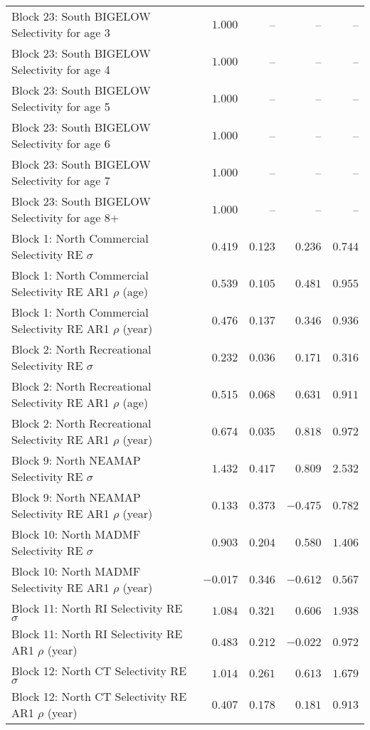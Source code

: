 \documentclass[
]{article}
\begin{document}
\begin{landscape}
\begin{longtable}[t]{lrrrr}
Block 23: South BIGELOW Selectivity for age 3 & $1.000$ & -- & -- & --\\
\addlinespace
Block 23: South BIGELOW Selectivity for age 4 & $1.000$ & -- & -- & --\\
Block 23: South BIGELOW Selectivity for age 5 & $1.000$ & -- & -- & --\\
Block 23: South BIGELOW Selectivity for age 6 & $1.000$ & -- & -- & --\\
Block 23: South BIGELOW Selectivity for age 7 & $1.000$ & -- & -- & --\\
Block 23: South BIGELOW Selectivity for age 8+ & $1.000$ & -- & -- & --\\
\addlinespace
Block 1: North Commercial Selectivity RE $\sigma$ & $0.419$ & $0.123$ & $0.236$ & $0.744$\\
Block 1: North Commercial Selectivity RE AR1 $\rho$ (age) & $0.539$ & $0.105$ & $0.481$ & $0.955$\\
Block 1: North Commercial Selectivity RE AR1 $\rho$ (year) & $0.476$ & $0.137$ & $0.346$ & $0.936$\\
Block 2: North Recreational Selectivity RE $\sigma$ & $0.232$ & $0.036$ & $0.171$ & $0.316$\\
Block 2: North Recreational Selectivity RE AR1 $\rho$ (age) & $0.515$ & $0.068$ & $0.631$ & $0.911$\\
\addlinespace
Block 2: North Recreational Selectivity RE AR1 $\rho$ (year) & $0.674$ & $0.035$ & $0.818$ & $0.972$\\
Block 9: North NEAMAP Selectivity RE $\sigma$ & $1.432$ & $0.417$ & $0.809$ & $2.532$\\
Block 9: North NEAMAP Selectivity RE AR1 $\rho$ (year) & $0.133$ & $0.373$ & $-0.475$ & $0.782$\\
Block 10: North MADMF Selectivity RE $\sigma$ & $0.903$ & $0.204$ & $0.580$ & $1.406$\\
Block 10: North MADMF Selectivity RE AR1 $\rho$ (year) & $-0.017$ & $0.346$ & $-0.612$ & $0.567$\\
\addlinespace
Block 11: North RI Selectivity RE $\sigma$ & $1.084$ & $0.321$ & $0.606$ & $1.938$\\
Block 11: North RI Selectivity RE AR1 $\rho$ (year) & $0.483$ & $0.212$ & $-0.022$ & $0.972$\\
Block 12: North CT Selectivity RE $\sigma$ & $1.014$ & $0.261$ & $0.613$ & $1.679$\\
Block 12: North CT Selectivity RE AR1 $\rho$ (year) & $0.407$ & $0.178$ & $0.181$ & $0.913$\\

\end{longtable}
\end{landscape}
\end{document}
